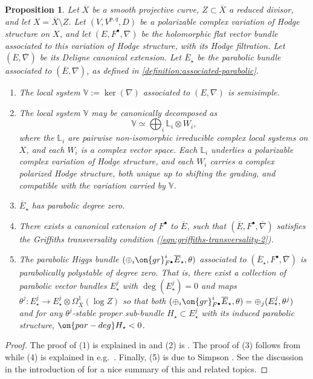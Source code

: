 \documentclass[12 pt]{amsart}
\theoremstyle{plain}
\newtheorem{proposition}[subsubsection]{Proposition}
\theoremstyle{definition}
\theoremstyle{remark}
\numberwithin{equation}{section}
\begin{document}
\begin{proposition}\label{prop:basic-facts}
Let $\overline{X}$ be a smooth projective curve, $Z\subset
\overline{X}$ a reduced divisor, and let
$X=\overline{X}\setminus Z$. 
Let $(V, V^{p,q}, D)$ be a polarizable complex variation of Hodge structure on
$X$, 
and let $(E, F^\bullet,
\nabla)$ be the holomorphic flat vector bundle associated to this variation of
Hodge structure, with its Hodge filtration. Let $(\overline{E}, \overline{\nabla})$ be its Deligne canonical extension.
Let $\overline{E}_\star$ be the parabolic bundle associated to $(\overline{E}, \nabla)$, as defined in
\autoref{definition:associated-parabolic}. 
\begin{enumerate}
    \item The local system $\mathbb{V}:=\ker(\nabla)$ associated to $(E, \nabla)$ is semisimple.
    \item The local system $\mathbb{V}$ may be canonically decomposed as $$\mathbb{V}\simeq \bigoplus_i \mathbb{L}_i\otimes
	    W_i,$$ where the $\mathbb{L}_i$ are pairwise non-isomorphic
	    irreducible complex local systems on $X$, and each $W_i$ is a complex vector
	    space. Each $\mathbb{L}_i$ underlies a polarizable complex
	    variation of Hodge structure, and each $W_i$ carries a complex polarized Hodge structure, both unique up to shifting the grading, and compatible with the variation carried by $\mathbb{V}$.
    \item $\overline{E}_\star$ has parabolic degree zero.
    \item There exists a canonical extension of $F^\bullet$ to $\overline{E}$, such that $(\overline{E}, F^\bullet, \overline{\nabla})$ satisfies the Griffiths transversality condition (\ref{eqn:griffiths-transversality-2}).
    \item The parabolic Higgs bundle $(\oplus_i
	    \on{gr}^i_{F^\bullet}\overline{E}_\star, \theta)$ associated
	    to $(\overline{E}_\star, F^\bullet, \overline{\nabla})$ is
	    parabolically polystable of degree zero. 
	    That is, there exist a collection of parabolic vector bundles
	    $E^j_\star$ with
	    $\deg(E^j_\star) = 0$ and maps
	    $\theta^j : E^j_\star \to E^j_\star \otimes \Omega^1_{\overline{X}}(\log Z)$ so that
	    both
	    $(\oplus_i\on{gr}^i_{F^\bullet}\overline{E}_\star,
	    \theta)=\oplus_j (E^j_\star, \theta^j)$
	    and for any
	    $\theta^j$-stable proper sub-bundle $H_\star \subset
	    E^j_\star$ with its induced parabolic structure, $\on{par-deg}
	    H_\star < 0$.
\end{enumerate}
\end{proposition}
\begin{proof}
	The proof of 
(1) is explained in \cite[1.11-1.12]{deligne1987theoreme} and (2) is
\cite[1.13]{deligne1987theoreme}. The proof of (3) follows from
\cite[B.3]{esnault1986logarithmic} 
while (4) is explained in e.g.~\cite[Section 7]{brunebarbe2017semi}. 
Finally,
(5) is due to Simpson \cite[Theorem 5]{simpson1990harmonic}. 
See the discussion in the introduction of \cite{arapura2019vanishing} for a nice summary of this and related topics.
\end{proof}
\end{document}
